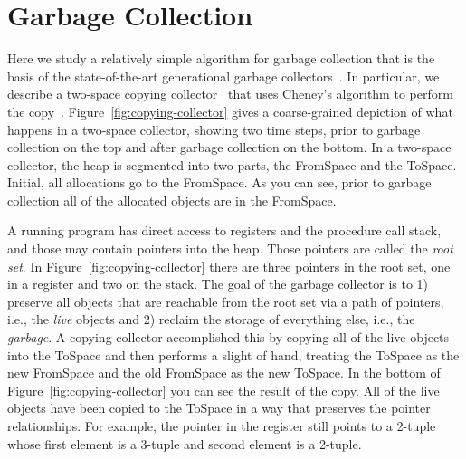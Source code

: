\documentclass[11pt]{book}
\begin{document}
\section{Garbage Collection}
\label{sec:GC}

Here we study a relatively simple algorithm for garbage collection
that is the basis of the state-of-the-art generational garbage
collectors~\citep{Lieberman:1983aa,Ungar:1984aa,Jones:1996aa,Detlefs:2004aa,Dybvig:2006aa}. In
particular, we describe a two-space copying
collector~\citep{Wilson:1992fk} that uses Cheney's algorithm to
perform the
copy~\citep{Cheney:1970aa}. Figure~\ref{fig:copying-collector} gives a
coarse-grained depiction of what happens in a two-space collector,
showing two time steps, prior to garbage collection on the top and
after garbage collection on the bottom. In a two-space collector, the
heap is segmented into two parts, the FromSpace and the
ToSpace. Initial, all allocations go to the FromSpace. As you can see,
prior to garbage collection all of the allocated objects are in the
FromSpace.

A running program has direct access to registers and the procedure
call stack, and those may contain pointers into the heap. Those
pointers are called the \emph{root set}. In
Figure~\ref{fig:copying-collector} there are three pointers in the
root set, one in a register and two on the stack. The goal of the
garbage collector is to 1) preserve all objects that are reachable
from the root set via a path of pointers, i.e., the \emph{live}
objects and 2) reclaim the storage of everything else, i.e., the
\emph{garbage}. A copying collector accomplished this by copying all
of the live objects into the ToSpace and then performs a slight of
hand, treating the ToSpace as the new FromSpace and the old FromSpace
as the new ToSpace. In the bottom of
Figure~\ref{fig:copying-collector} you can see the result of the copy.
All of the live objects have been copied to the ToSpace in a way that
preserves the pointer relationships. For example, the pointer in the
register still points to a 2-tuple whose first element is a 3-tuple
and second element is a 2-tuple.
\end{document}
